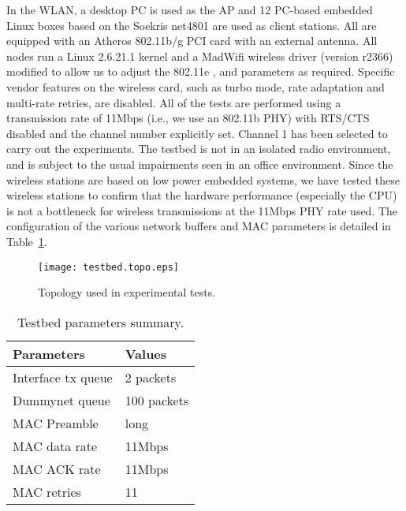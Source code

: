 \documentclass[10pt,twocolumn, journal]{IEEEtran}
\begin{document}
In the WLAN, a desktop PC is used as the AP and 12 PC-based embedded Linux boxes based on
the Soekris net4801 are used as client stations. All are equipped with an Atheros
802.11b/g PCI card with an external antenna. All nodes run a Linux 2.6.21.1 kernel and a
MadWifi wireless driver (version r2366) modified to allow us to adjust the 802.11e
,  and  parameters as required. Specific vendor features on the
wireless card, such as turbo mode, rate adaptation and multi-rate retries, are disabled.
All of the tests are performed using a transmission rate of 11Mbps (i.e., we use an
802.11b PHY) with RTS/CTS disabled and the channel number explicitly set. Channel 1 has
been selected to carry out the experiments. The testbed is not in an isolated radio
environment, and is subject to the usual impairments seen in an office environment. Since
the wireless stations are based on low power embedded systems, we have tested these
wireless stations to confirm that the hardware performance (especially the CPU) is not a
bottleneck for wireless transmissions at the 11Mbps PHY rate used. The configuration of
the various network buffers and MAC parameters is detailed in
Table~\ref{tab:paramsummary}.


\begin{figure}[tb]
    \centering
    \texttt{[image: testbed.topo.eps]}
    \caption{Topology used in experimental tests.   }
    \label{fig_topo}
\end{figure}

\begin{table}[tb]
    \begin{center}
\begin{tabular}{|l|l|}
            \hline
            \textbf{Parameters}      & \textbf{Values}  \\
            \hline
            Interface tx queue & 2 packets  \\
            \hline
            Dummynet queue     & 100 packets  \\
            \hline
            MAC Preamble  & long \\
            \hline
            MAC data rate  & 11Mbps \\
            \hline
            MAC ACK rate & 11Mbps\\
            \hline
            MAC retries & 11 \\
            \hline
            \end{tabular}
\end{center}
    \caption{Testbed parameters summary.} \label{tab:paramsummary}
\end{table}
\end{document}
